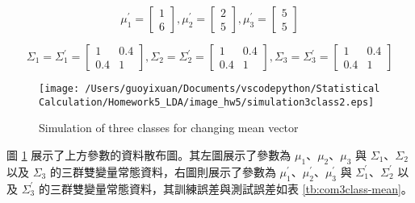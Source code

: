 \begin{itemize}
$$ \mu_1^{'} = \left[
            \begin{array}{clr}
                1  \\
                6 
            \end{array} \right] ,
            \mu_2^{'} = \left[
            \begin{array}{clr}
                2  \\
                5 
            \end{array} \right],
            \mu_3^{'} = \left[
            \begin{array}{clr}
                5  \\
                5 
            \end{array} \right]$$ 

$$ \Sigma_1=\Sigma_1^{'} = \left[
            \begin{array}{clr}
                1 & 0.4  \\
                0.4 & 1
            \end{array} \right] ,
            \Sigma_2=\Sigma_2^{'} = \left[
            \begin{array}{clr}
                1 & 0.4  \\
                0.4 & 1 
            \end{array} \right]  ,
            \Sigma_3=\Sigma_3^{'} = \left[
            \begin{array}{clr}
                1 & 0.4  \\
                0.4 & 1 
            \end{array} \right] $$
                      
\begin{figure}[H]
    \centering
        \texttt{[image: /Users/guoyixuan/Documents/vscodepython/Statistical Calculation/Homework5\_LDA/image\_hw5/simulation3class2.eps]}
    \caption{Simulation of three classes for changing mean vector}
    \label{fig:mean vector 3 class}
\end{figure} 

圖 \ref{fig:mean vector 3 class} 展示了上方參數的資料散布圖。其左圖展示了參數為 $\mu_1$、$\mu_2$、$\mu_3$ 與 $\Sigma_1$、$\Sigma_2$ 以及 $\Sigma_3$ 的三群雙變量常態資料，右圖則展示了參數為 $\mu_1^{'}$、$\mu_2^{'}$、$\mu_3^{'}$ 與 $\Sigma_1^{'}$、$\Sigma_2^{'}$ 以及 $\Sigma_3^{'}$ 的三群雙變量常態資料，其訓練誤差與測試誤差如表 \ref{tb:com3class-mean}。


\end{itemize}
